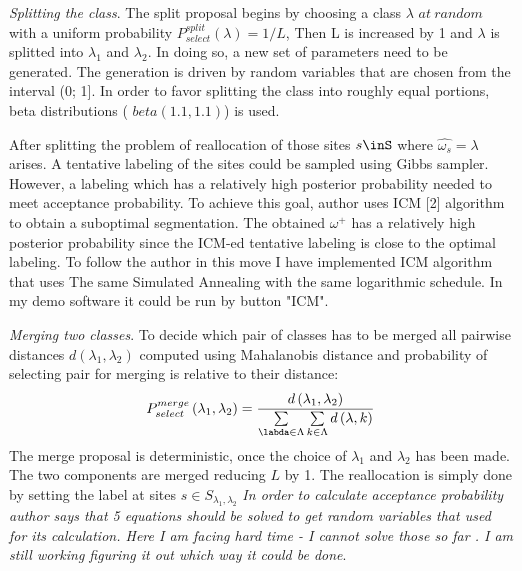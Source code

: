 \documentclass[journal]{IEEEtran}
\begin{document}
\emph{Splitting the class}. The split proposal begins by choosing a class $\lambda$ $at~random$ with a uniform probability $P_{select}^{split}\left(\lambda\right) = 1/L$, Then L is increased by 1 and $\lambda$ is splitted into $\lambda_{1}$ and $\lambda_{2}$. In doing so, a new set of parameters need to be generated. The generation is driven by random variables that are chosen from the interval (0; 1]. In order to favor splitting the class into roughly equal portions, beta distributions ( $beta(1.1,1.1)$) is used.

After splitting the problem of reallocation of those sites $s\inS$ where $\widehat{\omega_{s}}=\lambda$ arises. A tentative labeling of the sites could be sampled using Gibbs sampler. However, a labeling which has a relatively high posterior probability needed to meet acceptance probability. To achieve this goal, author uses ICM [2] algorithm to obtain a suboptimal segmentation. The obtained $\omega^{+}$ has a relatively high posterior probability since the ICM-ed tentative labeling is close to the optimal labeling. To follow the author in this move I have implemented ICM algorithm that uses The same Simulated Annealing with the same logarithmic schedule. In my demo software it could be run by button "ICM".

\emph{Merging two classes}.
To decide which pair of classes has to be merged all pairwise distances $d\left(\lambda_{1},\lambda_{2}\right)$ computed using Mahalanobis distance and probability of selecting pair for merging is relative to their distance:
\begin{equation}
P_{select}^{merge}\left(\lambda_{1},\lambda_{2}\right) = \frac{d\left(\lambda_{1},\lambda_{2}\right)}{\sum\limits_{\labda\in\Lambda}\sum\limits_{k\in\Lambda}d\left(\lambda,k\right)}
\end{equation}
The merge proposal is deterministic, once the choice of $\lambda_{1}$ and $\lambda_{2}$ has been made. The two components are merged reducing $L$ by 1.
The reallocation is simply done by setting the label at sites $s\in S_{\lambda_{1},\lambda_{2}}$ \emph{In order to calculate acceptance probability author says that 5 equations should be solved to get random variables that used for its calculation. Here I am facing hard time - I cannot solve those so far . I am still working figuring it out which way it could be done}.
\end{document}
